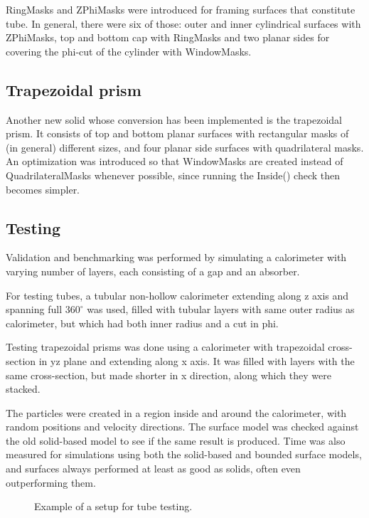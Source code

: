 \documentclass[12pt, a4paper]{article}
\begin{document}
RingMasks and ZPhiMasks were introduced for framing surfaces that constitute tube. In general, there were six of those: outer and inner cylindrical surfaces with ZPhiMasks, top and bottom cap with RingMasks and two planar sides for covering the phi-cut of the cylinder with WindowMasks.


\subsection{Trapezoidal prism}

Another new solid whose conversion has been implemented is the trapezoidal prism. It consists of top and bottom planar surfaces with rectangular masks of (in general) different sizes, and four planar side surfaces with quadrilateral masks. An optimization was introduced so that WindowMasks are created instead of QuadrilateralMasks whenever possible, since running the {\selectfont Inside()} check then becomes simpler.


\subsection{Testing}

Validation and benchmarking was performed by simulating a calorimeter with varying number of layers, each consisting of a gap and an absorber.

For testing tubes, a tubular non-hollow calorimeter extending along z axis and spanning full $360^\circ$ was used, filled with tubular layers with same outer radius as calorimeter, but which had both inner radius and a cut in phi.

Testing trapezoidal prisms was done using a calorimeter with trapezoidal cross-section in yz plane and extending along x axis. It was filled with layers with the same cross-section, but made shorter in x direction, along which they were stacked.

The particles were created in a region inside and around the calorimeter, with random positions and velocity directions. The surface model was checked against the old solid-based model to see if the same result is produced. Time was also measured for simulations using both the solid-based and bounded surface models, and surfaces always performed at least as good as solids, often even outperforming them.

\begin{figure}[h]
\begin{minipage}{0.45\textwidth}
		\centering
		
\end{minipage}
\begin{minipage}{0.45\textwidth}
	\centering
	
\end{minipage}
\caption{Example of a setup for tube testing.}
\label{fig:testTubes}
\end{figure}
\end{document}
